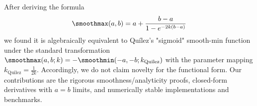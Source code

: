 After deriving the formula
\begin{align}
    \smoothmax(a,b) = a + \frac{b - a}{1-e^{-2k(b - a)}}
\end{align}
we found it is algebraically equivalent to Quílez's "sigmoid" smooth-min function \cite{Quilez2013} under the standard transformation $\smoothmax(a,b; k) = -\smoothmin(-a,-b;k_\text{Quilez})$ with the parameter mapping $k_\text{Quilez} = \frac{1}{2k}$. Accordingly, we do not claim novelty for the functional form. Our contributions are the rigorous smoothness/analyticity proofs, closed-form derivatives with $a = b$ limits, and numerically stable implementations and benchmarks.
